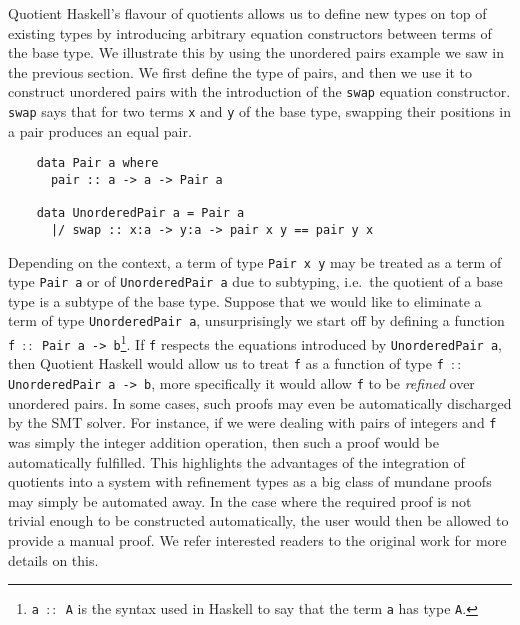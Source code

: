 \documentclass[12pt,twoside,maitrise]{dms}
\theoremstyle{definition}
\numberwithin{equation}{section}
\numberwithin{table}{chapter}
\numberwithin{figure}{chapter}
\newcommand\id[1] {\texttt{#1}}
\newcommand\fn[1] {\texttt{#1}}
\newcommand\latinphrase{\textit}
\begin{document}
Quotient Haskell's flavour of quotients allows us to define new types on top of
existing types by introducing arbitrary equation constructors between terms of
the base type. We illustrate this by using the unordered pairs example we saw in
the previous section. We first define the type of pairs, and
then we use it to construct unordered pairs with the introduction of the
\id{swap} equation constructor. \id{swap} says that for two terms \id{x} and
\id{y} of the base type, swapping their positions in a pair produces an equal
pair.

\begin{verbatim}
    data Pair a where
      pair :: a -> a -> Pair a

    data UnorderedPair a = Pair a
      |/ swap :: x:a -> y:a -> pair x y == pair y x
\end{verbatim}

Depending on the context, a term of type \fn{Pair x y} may be treated as a term
of type \fn{Pair a} or of \fn{UnorderedPair a} due to subtyping, i.e.\ the
quotient of a base type is a subtype of the base type. Suppose that we would
like to eliminate a term of type \fn{UnorderedPair a}, unsurprisingly we start
off by defining a function \fn{f ${\colon}{\colon}$ Pair a -> b}\footnote{\fn{a
  ${\colon}{\colon}$ A} is the syntax used in Haskell to say that the term
\id{a} has type \id{A}.}. If \id{f} respects the equations introduced by
\fn{UnorderedPair a}, then Quotient Haskell would allow us to treat \id{f} as a
function of type \fn{f ${\colon}{\colon}$ UnorderedPair a -> b}, more
specifically it would allow \id{f} to be \emph{refined} over unordered pairs. In
some cases, such proofs may even be automatically discharged by the SMT solver.
For instance, if we were dealing with pairs of integers and \id{f} was simply
the integer addition operation, then such a proof would be automatically
fulfilled. This highlights the advantages of the integration of quotients into a
system with refinement types as a big class of mundane proofs may simply be
automated away. In the case where the required proof is not trivial enough to be
constructed automatically, the user would then be allowed to provide a manual
proof. We refer interested readers to the original work for more details on
this.

\end{document}
